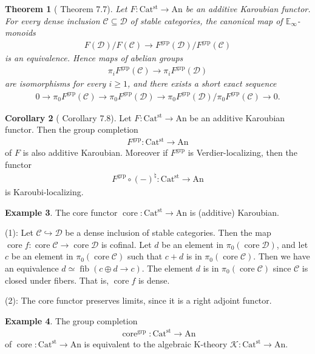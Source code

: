 \documentclass[a4paper,dvipdfmx,11pt,reqno]{amsart}
\DeclareMathOperator{\fib}{fib}
\newcommand{\C}{\mathcal{C}}
\newcommand{\D}{\mathcal{D}}
\newcommand{\K}{\mathcal{K}}
\DeclareMathOperator{\core}{core}
\DeclareMathOperator{\grp}{grp}
\newcommand{\An}{\mathrm{An}}
\newcommand{\Catst}{\mathrm{Cat^{st}}}
\newcommand{\Einf}{\mathbb{E}_{\infty}}
\newtheorem{theorem}{Theorem}[section]
\theoremstyle{definition}
\newtheorem{corollary}[theorem]{Corollary}
\newtheorem{example}[theorem]{Example}
\begin{document}
\begin{theorem}[\cite{HLS23} Theorem 7.7] \label{HLS23.thrm.7.7}
  Let $F : \Catst \to \An$ be an additive Karoubian functor.
  For every dense inclusion $\C \subseteq \D$ of stable categories, the canonical map of $\Einf$-monoids
  \begin{align*}
    F(\D)/F(\C) \to F^{\grp}(\D)/F^{\grp}(\C)
  \end{align*}
  is an equivalence.
  Hence maps of abelian groups
  \begin{align*}
    \pi_iF^{\grp}(\C) \to \pi_iF^{\grp}(\D)
  \end{align*}
  are isomorphisms for every $i \geq 1$, and there exists a short exact sequence 
  \begin{align*}
    0 \to \pi_0F^{\grp}(\C) \to \pi_0F^{\grp}(\D) \to \pi_0F^{\grp}(\D)/\pi_0F^{\grp}(\C) \to 0.
  \end{align*}
\end{theorem}

\begin{corollary}[\cite{HLS23} Corollary 7.8] \label{HLS23.cor.7.8}
  Let $F : \Catst \to \An$ be an additive Karoubian functor.
  Then the group completion 
  \begin{align*}
    F^{\grp} : \Catst \to \An
  \end{align*}
  of $F$ is also additive Karoubian.
  Moreover if $F^{\grp}$ is Verdier-localizing, then the functor
  \begin{align*}
    F^{\grp} \circ (-)^{\natural} : \Catst \to \An
  \end{align*}
  is Karoubi-localizing.
\end{corollary}

\begin{example} \label{Ber.rem.5.50}
  The core functor $\core : \Catst \to \An$ is (additive) Karoubian.

  (1):
  Let $\C \hookrightarrow \D$ be a dense inclusion of stable categories.
  Then the map $\core f : \core\C \to \core\D$ is cofinal.
  Let $d$ be an element in $\pi_0(\core\D)$, and let $c$ be an element in $\pi_0(\core\C)$ such that $c+d$ is in $\pi_0(\core\C)$.
  Then we have an equivalence $d \simeq \fib(c \oplus d \to c)$.
  The element $d$ is in $\pi_0(\core\C)$ since $\C$ is closed under fibers.
  That is, $\core f$ is dense.

  (2):
  The core functor preserves limits, since it is a right adjoint functor.
\end{example}

\begin{example} \label{eg.group_completion_of_core}
  The group completion 
  \begin{align*}
    \core^{\grp} : \Catst \to \An
  \end{align*}
  of $\core : \Catst \to \An$ is equivalent to the algebraic K-theory $\K : \Catst \to \An$.
\end{example}
\end{document}
